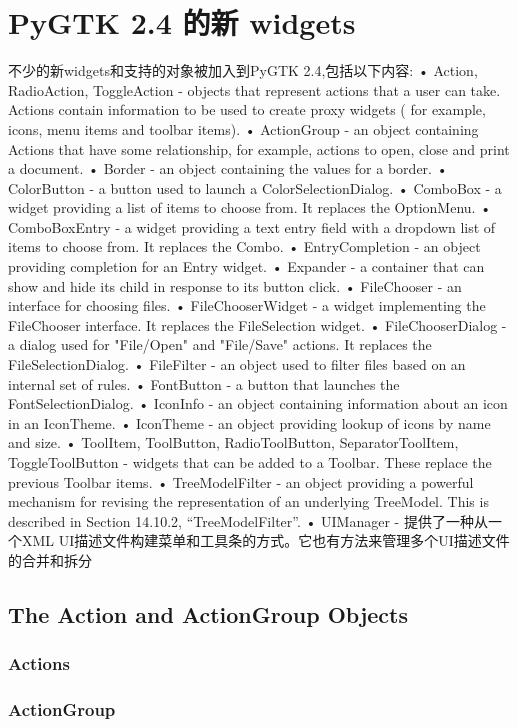 \chapter{PyGTK 2.4 的新 widgets}
不少的新widgets和支持的对象被加入到PyGTK 2.4,包括以下内容:
• Action, RadioAction, ToggleAction - objects that represent actions that a user can take. Actions contain
information to be used to create proxy widgets ( for example, icons, menu items and toolbar items).
• ActionGroup - an object containing Actions that have some relationship, for example, actions to open, close
and print a document.
• Border - an object containing the values for a border.
• ColorButton - a button used to launch a ColorSelectionDialog.
• ComboBox - a widget providing a list of items to choose from. It replaces the OptionMenu.
• ComboBoxEntry - a widget providing a text entry field with a dropdown list of items to choose from. It replaces
the Combo.
• EntryCompletion - an object providing completion for an Entry widget.
• Expander - a container that can show and hide its child in response to its button click.
• FileChooser - an interface for choosing files.
• FileChooserWidget - a widget implementing the FileChooser interface. It replaces the
  FileSelection widget. 
• FileChooserDialog - a dialog used for "File/Open" and "File/Save" actions. It replaces the
    FileSelectionDialog. 
• FileFilter - an object used to filter files based on an internal set of rules.
• FontButton - a button that launches the FontSelectionDialog.
• IconInfo - an object containing information about an icon in an IconTheme.
• IconTheme - an object providing lookup of icons by name and size.
• ToolItem, ToolButton, RadioToolButton, SeparatorToolItem, ToggleToolButton - widgets
that can be added to a Toolbar. These replace the previous Toolbar items.
• TreeModelFilter - an object providing a powerful mechanism for revising the representation of an underlying
TreeModel. This is described in Section 14.10.2, “TreeModelFilter”.
• UIManager - 提供了一种从一个XML UI描述文件构建菜单和工具条的方式。它也有方法来管理多个UI描述文件的合并和拆分
\section{The Action and ActionGroup Objects}
	\subsection{Actions}
	\subsection{ActionGroup}
